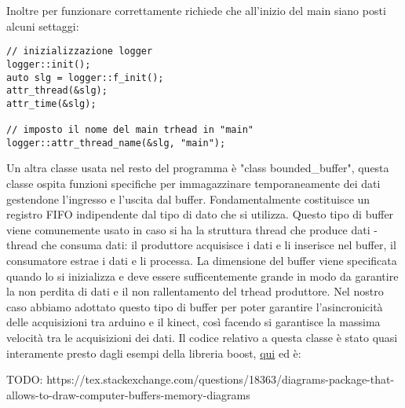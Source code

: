 \documentclass[10pt,a4paper]{article}
\begin{document}
Inoltre per funzionare correttamente richiede che all'inizio del main siano posti alcuni settaggi:
\begin{lstlisting}[style=mycpp, caption=librerie usate, captionpos=b]
// inizializzazione logger
logger::init();
auto slg = logger::f_init();
attr_thread(&slg);
attr_time(&slg);

// imposto il nome del main trhead in "main"
logger::attr_thread_name(&slg, "main");
\end{lstlisting}
%
%
Un altra classe usata nel resto del programma \`e "class bounded\_buffer", questa classe ospita funzioni specifiche per immagazzinare temporaneamente dei dati gestendone l'ingresso e l'uscita dal buffer. Fondamentalmente costituisce un registro FIFO indipendente dal tipo di dato che si utilizza. Questo tipo di buffer viene comunemente usato in caso si ha la struttura thread che produce dati - thread che consuma dati: il produttore acquisisce i dati e li inserisce nel buffer, il consumatore estrae i dati e li processa. La dimensione del buffer viene specificata quando lo si inizializza e deve essere sufficentemente grande in modo da garantire la non perdita di dati e il non rallentamento del trhead produttore. Nel nostro caso abbiamo adottato questo tipo di buffer per poter garantire l'asincronicit\`a delle acquisizioni tra arduino e il kinect, cos\`i facendo si garantisce la massima velocit\`a tra le acquisizioni dei dati. Il codice relativo a questa classe \`e stato quasi interamente presto dagli esempi della libreria boost, \href{https://www.boost.org/doc/libs/1_69_0/doc/html/circular_buffer/examples.html}{qui} ed \`e:

TODO: https://tex.stackexchange.com/questions/18363/diagrams-package-that-allows-to-draw-computer-buffers-memory-diagrams
\end{document}

